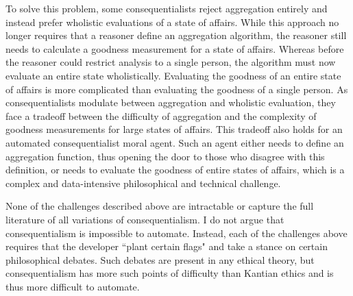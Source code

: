 \begin{isabellebody}
\begin{isamarkuptext}
To solve this problem, some consequentialists reject aggregation entirely and instead prefer wholistic
evaluations of a state of affairs. While this approach no longer requires that a reasoner define an 
aggregation algorithm, the reasoner still needs to calculate a goodness measurement for a state of 
affairs. Whereas before the reasoner could restrict analysis to a single person, the algorithm must now 
evaluate an entire state wholistically. Evaluating the goodness of an entire state of affairs is more complicated
than evaluating the goodness of a single person. As consequentialists modulate between aggregation 
and wholistic evaluation, they face a tradeoff between the difficulty of aggregation and the complexity 
of goodness measurements for large states of affairs. This tradeoff also holds for an automated
consequentialist moral agent. Such an agent either needs to define an aggregation function, thus opening 
the door to those who disagree with this definition, or needs to evaluate the goodness of entire states
of affairs, which is a complex and data-intensive philosophical and technical challenge.%
\end{isamarkuptext}\isamarkuptrue%
%
\isadelimdocument
%
\endisadelimdocument
%
\isatagdocument
%
\isamarkuptrue%
%
\endisatagdocument
{\isafolddocument}%
%
\isadelimdocument
%
\endisadelimdocument
%
\begin{isamarkuptext}%
None of the challenges described above are intractable or capture the full literature of 
all variations of consequentialism. I do not argue that consequentialism is 
impossible to automate. Instead, each of the challenges above requires that the developer 
``plant certain flags" and take a stance on certain philosophical debates. Such debates are present in 
any ethical theory, but consequentialism has more such points of difficulty than Kantian ethics and 
is thus more difficult to automate. 


\end{isamarkuptext}
\end{isabellebody}
